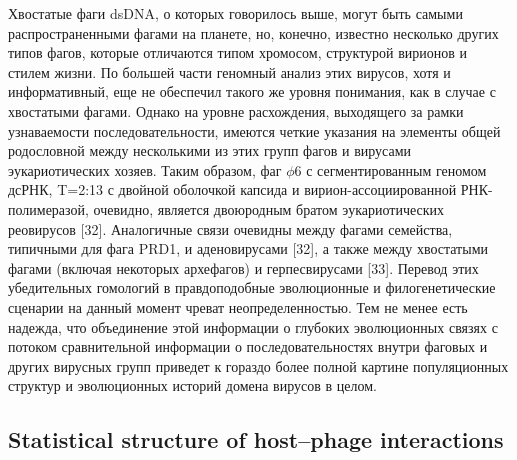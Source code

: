 \documentclass[a4paper,12pt]{article}
\begin{document}
    \par{Хвостатые фаги dsDNA, о которых говорилось выше, могут быть самыми распространенными фагами на планете, но,
    конечно, известно несколько других типов фагов, которые отличаются типом хромосом, структурой вирионов и стилем
    жизни. По большей части геномный анализ этих вирусов, хотя и информативный, еще не обеспечил такого же уровня
    понимания, как в случае с хвостатыми фагами. Однако на уровне расхождения, выходящего за рамки узнаваемости
    последовательности, имеются четкие указания на элементы общей родословной между несколькими из этих групп фагов и
    вирусами эукариотических хозяев. Таким образом, фаг $\phi$6 с сегментированным геномом дсРНК, T=2:13 с двойной
    оболочкой капсида и вирион-ассоциированной РНК-полимеразой, очевидно, является двоюродным братом эукариотических
    реовирусов [32]. Аналогичные связи очевидны между фагами семейства, типичными для фага PRD1, и аденовирусами [32],
    а также между хвостатыми фагами (включая некоторых архефагов) и герпесвирусами [33]. Перевод этих убедительных
    гомологий в правдоподобные эволюционные и филогенетические сценарии на данный момент чреват неопределенностью. Тем
    не менее есть надежда, что объединение этой информации о глубоких эволюционных связях с потоком сравнительной
    информации о последовательностях внутри фаговых и других вирусных групп приведет к гораздо более полной картине
    популяционных структур и эволюционных историй домена вирусов в целом.}
    
\begin{center}
   \item \subsection{Statistical structure of host–phage interactions \cite{structure}}
\end{center}
    
\end{document}
